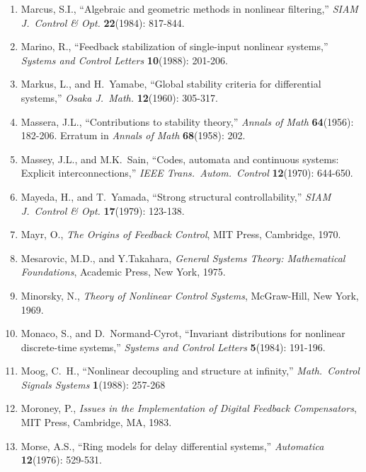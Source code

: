 \begin{enumerate}
\item
Marcus, S.I., ``Algebraic and geometric methods in nonlinear filtering,'' {\it
SIAM J.\ Control \& Opt.} {\bf 22}(1984): 817-844.

\item
Marino, R., ``Feedback stabilization of single-input nonlinear systems,'' {\it
Systems and Control Letters} {\bf 10}(1988): 201-206.

\item
Markus, L., and H.\ Yamabe, ``Global stability criteria for differential
systems,'' {\it Osaka J.\ Math.} {\bf 12}(1960): 305-317.

\item
Massera, J.L., ``Contributions to stability theory,'' {\it Annals of Math}
{\bf 64}(1956): 182-206.  Erratum in {\it Annals of Math} {\bf 68}(1958): 202.

\item
Massey, J.L., and M.K.\ Sain, ``Codes, automata and continuous systems:
Explicit interconnections,'' {\it IEEE Trans.\ Autom.\ Control} {\bf
12}(1970): 644-650.

\item
Mayeda, H., and T.\ Yamada, ``Strong structural controllability,'' {\it SIAM
J.\ Control \& Opt.} {\bf 17}(1979): 123-138.

\item
Mayr, O., {\it The Origins of Feedback Control}, MIT Press, Cambridge, 1970.

\item
Mesarovic, M.D., and Y.Takahara, {\it General Systems Theory: Mathematical
Foundations}, Academic Press, New York, 1975.

\item
Minorsky, N., {\it Theory of Nonlinear Control Systems}, McGraw-Hill, New
York, 1969.

\item
Monaco, S., and D.\ Normand-Cyrot, ``Invariant distributions for nonlinear
discrete-time systems,'' {\it Systems and Control Letters} {\bf 5}(1984):
191-196.

\item
Moog, C.\ H., ``Nonlinear decoupling and structure at infinity,'' {\it Math.\
Control Signals Systems} {\bf 1}(1988): 257-268

\item
Moroney, P., {\it Issues in the Implementation of Digital Feedback
Compensators}, MIT Press, Cambridge, MA, 1983.

\item
Morse, A.S., ``Ring models for delay differential systems,'' {\it Automatica}
{\bf 12}(1976): 529-531.


\end{enumerate}
